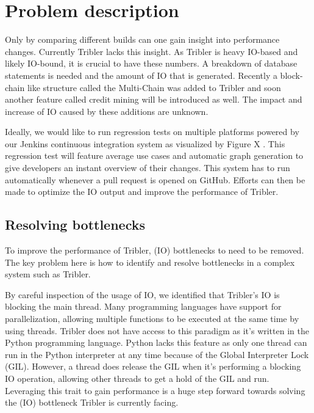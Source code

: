 \chapter{Problem description}
\label{chp:problem-description}

Only by comparing different builds can one gain insight into performance changes.
Currently Tribler lacks this insight.
As Tribler is heavy IO-based and likely IO-bound, it is crucial to have these numbers.
A breakdown of database statements is needed and the amount of IO that is generated.
Recently a block-chain like structure called the Multi-Chain was added to Tribler and soon another feature called credit mining will be introduced as well.
The impact and increase of IO caused by these additions are unknown.

Ideally, we would like to run regression tests on multiple platforms powered by our Jenkins continuous integration system as visualized by Figure X .
This regression test will feature average use cases and automatic graph generation to give developers an instant overview of their changes.
This system has to run automatically whenever a pull request is opened on GitHub.
Efforts can then be made to optimize the IO output and improve the performance of Tribler.

\section{Resolving bottlenecks}
To improve the performance of Tribler, (IO) bottlenecks to need to be removed.
The key problem here is how to identify and resolve bottlenecks in a complex system such as Tribler.

By careful inspection of the usage of IO, we identified that Tribler's IO is blocking the main thread.
Many programming languages have support for parallelization, allowing multiple functions to be executed at the same time by using threads.
Tribler does not have access to this paradigm as it's written in the Python programming language.
Python lacks this feature as only one thread can run in the Python interpreter at any time because of the Global Interpreter Lock (GIL).
However, a thread does release the GIL when it's performing a blocking IO operation, allowing other threads to get a hold of the GIL and run.
Leveraging this trait to gain performance is a huge step forward towards solving the (IO) bottleneck Tribler is currently facing.

